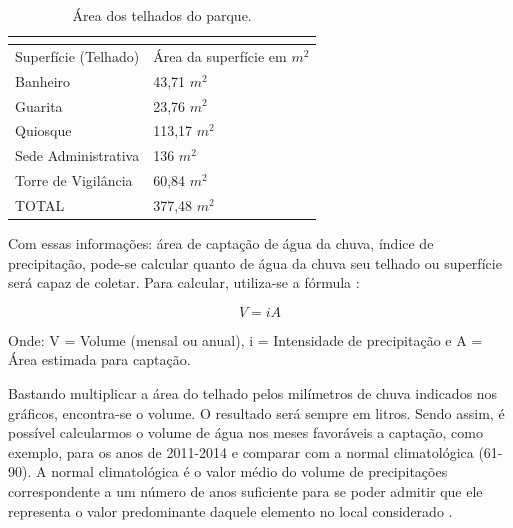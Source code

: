 \begin{table}[h]
\centering
\caption{Área dos telhados do parque.}
\label{Área dos telhados do parque.}
\begin{tabular}{lll}
 & \multicolumn{2}{l}{} \\ \hline
\multicolumn{1}{|l|}{Superfície (Telhado)} & \multicolumn{2}{l|}{Área da superfície em $m^{2}$} \\ \hline
\multicolumn{1}{|l|}{Banheiro} & \multicolumn{2}{l|}{43,71 $m^{2}$} \\ \hline
\multicolumn{1}{|l|}{Guarita} & \multicolumn{2}{l|}{23,76 $m^{2}$} \\ \hline
\multicolumn{1}{|l|}{Quiosque} & \multicolumn{2}{l|}{113,17 $m^{2}$} \\ \hline
\multicolumn{1}{|l|}{Sede Administrativa} & \multicolumn{2}{l|}{136 $m^{2}$} \\ \hline
\multicolumn{1}{|l|}{Torre de Vigilância} & \multicolumn{2}{l|}{60,84 $m^{2}$} \\ \hline
\multicolumn{1}{|l|}{TOTAL} & \multicolumn{2}{l|}{377,48 $m^{2}$} \\ \hline
\end{tabular}
\end{table}

Com essas informações: área de captação de água da chuva, índice de precipitação, pode-se calcular quanto de água da chuva seu telhado ou superfície será capaz de coletar. Para calcular, utiliza-se a fórmula \cite{SANEPAR}:

\begin{equation}
V = iA 
\end{equation}


Onde: V = Volume (mensal ou anual),  i = Intensidade de precipitação e A = Área estimada para captação. 

Bastando multiplicar a área do telhado pelos milímetros de chuva indicados nos gráficos, encontra-se o volume. O resultado será sempre em litros. Sendo assim, é possível calcularmos o volume de água nos meses favoráveis a captação, como exemplo, para os anos de 2011-2014 e comparar com a normal climatológica (61-90). A normal climatológica é o valor médio do volume de precipitações correspondente a um número de anos suficiente para se poder admitir que ele representa o valor predominante daquele elemento no local considerado \cite{IPMA}.


